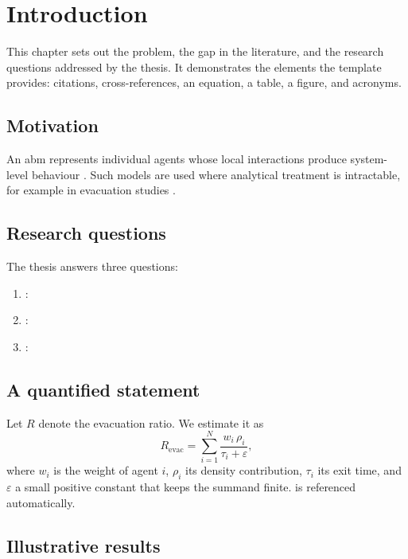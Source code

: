 \chapter{Introduction}
\label{ch:introduction}

This chapter sets out the problem, the gap in the literature, and the
research questions addressed by the thesis. It demonstrates the elements
the template provides: citations, cross-references, an equation, a table,
a figure, and acronyms.

\section{Motivation}

An \gls{abm} represents individual agents whose local interactions produce
system-level behaviour \autocite{bonabeau2002}. Such models are used where
analytical treatment is intractable, for example in evacuation studies
\autocite{helbing2000}.

\section{Research questions}

The thesis answers three questions:

\begin{enumerate}
  \item {}: \rqone
  \item {}: \rqtwo
  \item {}: \rqthree
\end{enumerate}

\section{A quantified statement}

Let $R$ denote the evacuation ratio. We estimate it as
\begin{equation}
  R_{\mathrm{evac}} = \sum_{i=1}^{N} \frac{w_i\,\rho_i}{\tau_i + \varepsilon},
  \label{eq:revac}
\end{equation}
where $w_i$ is the weight of agent $i$, $\rho_i$ its density contribution,
$\tau_i$ its exit time, and $\varepsilon$ a small positive constant that
keeps the summand finite.  is referenced automatically.

\section{Illustrative results}

